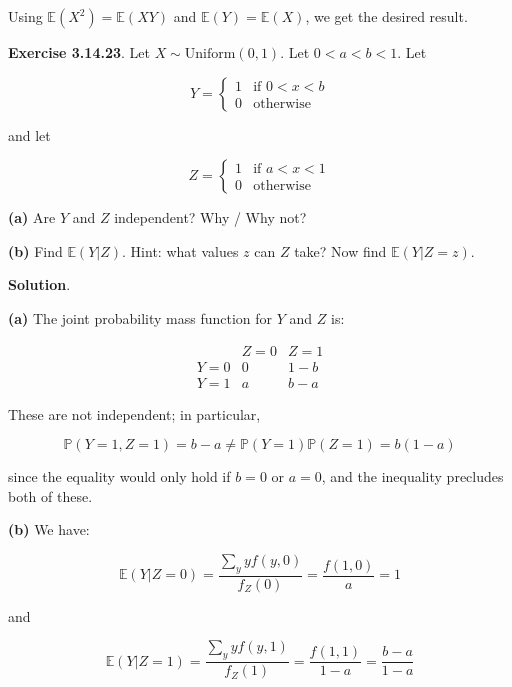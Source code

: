 Using \(\mathbb{E}(X^2) = \mathbb{E}(XY)\) and
\(\mathbb{E}(Y) = \mathbb{E}(X)\), we get the desired result.

\textbf{Exercise 3.14.23}. Let \(X \sim \text{Uniform}(0, 1)\). Let
\(0 < a < b < 1\). Let

\[
Y = \begin{cases}
1 &\text{if } 0 < x < b \\
0 &\text{otherwise}
\end{cases}
\]

and let

\[
Z = \begin{cases}
1 &\text{if } a < x < 1 \\
0 &\text{otherwise}
\end{cases}
\]

\textbf{(a)} Are \(Y\) and \(Z\) independent? Why / Why not?

\textbf{(b)} Find \(\mathbb{E}(Y | Z)\). Hint: what values \(z\) can
\(Z\) take? Now find \(\mathbb{E}(Y | Z = z)\).

\textbf{Solution}.

\textbf{(a)} The joint probability mass function for \(Y\) and \(Z\) is:

\[
\begin{array}{c|cc}
 & Z = 0 & Z = 1 \\
\hline
Y = 0 & 0 & 1 - b \\
Y = 1 & a & b - a
\end{array}
\]

These are not independent; in particular,

\[ \mathbb{P}(Y = 1, Z = 1) = b - a \neq \mathbb{P}(Y = 1) \mathbb{P}(Z = 1) = b(1 - a) \]

since the equality would only hold if \(b = 0\) or \(a = 0\), and the
inequality precludes both of these.

\textbf{(b)} We have:

\[ \mathbb{E}(Y | Z = 0) = \frac{\sum_y y f(y, 0)}{f_Z(0)} = \frac{f(1, 0)}{a} = 1 \]

and

\[ \mathbb{E}(Y | Z = 1) = \frac{\sum_y y f(y, 1)}{f_Z(1)} = \frac{f(1, 1)}{1 - a} = \frac{b - a}{1 - a} \]
